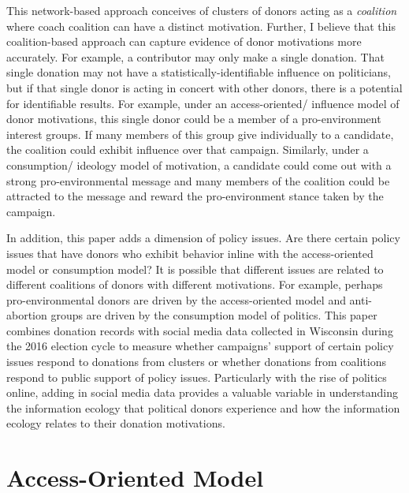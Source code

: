 \documentclass[12pt,]{article}
\begin{document}
This network-based approach conceives of clusters of donors acting as a
\emph{coalition} where coach coalition can have a distinct motivation.
Further, I believe that this coalition-based approach can capture
evidence of donor motivations more accurately. For example, a
contributor may only make a single donation. That single donation may
not have a statistically-identifiable influence on politicians, but if
that single donor is acting in concert with other donors, there is a
potential for identifiable results. For example, under an
access-oriented/ influence model of donor motivations, this single donor
could be a member of a pro-environment interest groups. If many members
of this group give individually to a candidate, the coalition could
exhibit influence over that campaign. Similarly, under a consumption/
ideology model of motivation, a candidate could come out with a strong
pro-environmental message and many members of the coalition could be
attracted to the message and reward the pro-environment stance taken by
the campaign.

In addition, this paper adds a dimension of policy issues. Are there
certain policy issues that have donors who exhibit behavior inline with
the access-oriented model or consumption model? It is possible that
different issues are related to different coalitions of donors with
different motivations. For example, perhaps pro-environmental donors are
driven by the access-oriented model and anti-abortion groups are driven
by the consumption model of politics. This paper combines donation
records with social media data collected in Wisconsin during the 2016
election cycle to measure whether campaigns' support of certain policy
issues respond to donations from clusters or whether donations from
coalitions respond to public support of policy issues. Particularly with
the rise of politics online, adding in social media data provides a
valuable variable in understanding the information ecology that
political donors experience and how the information ecology relates to
their donation motivations.

\hypertarget{access-oriented-model}{%
\section{Access-Oriented Model}\label{access-oriented-model}}
\end{document}

